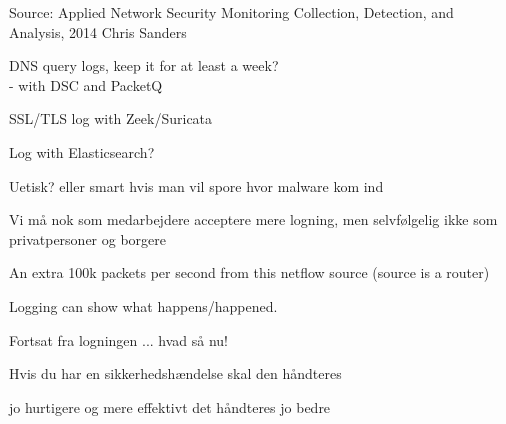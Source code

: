 \documentclass[Screen16to9,17pt]{foils}
\begin{document}
Source: Applied Network Security Monitoring Collection, Detection, and Analysis, 2014 Chris Sanders




\begin{list2}
\item DNS query logs, keep it for at least a week?\\
- with DSC and PacketQ 
\item SSL/TLS log with Zeek/Suricata\\
{\footnotesize{}}
\item Log with Elasticsearch?\\
{\footnotesize{}}
\item  Uetisk? eller smart hvis man vil spore hvor malware kom ind
\item Vi må nok som medarbejdere acceptere mere logning, men selvfølgelig ikke som privatpersoner og borgere
\end{list2}




\centerline{An extra 100k packets per second from this netflow source (source is a router)}

Logging can show what happens/happened.









\begin{list2}
\item Fortsat fra logningen ... hvad så nu!
\item Hvis du har en sikkerhedshændelse skal den håndteres
\item jo hurtigere og mere effektivt det håndteres jo bedre
\end{list2}
\end{document}
